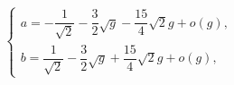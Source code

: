 \begin{equation}
    \left\{
    \begin{array}{l}
    a=-\dfrac{1}{\sqrt 2}-\dfrac 3
    2\sqrt{g}-\dfrac{15}{4}\sqrt{2}g+o(g),
    \\
    b=\dfrac{1}{\sqrt 2}-\dfrac 3
    2\sqrt{g}+\dfrac{15}{4}\sqrt{2}g+o(g),
    \end{array}
    \right.
\end{equation}

